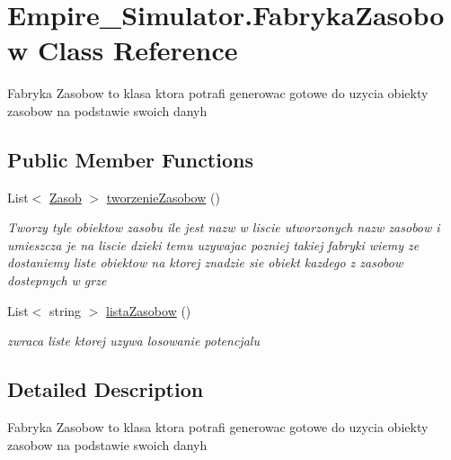 \hypertarget{class_empire___simulator_1_1_fabryka_zasobow}{\section{Empire\+\_\+\+Simulator.\+Fabryka\+Zasobow Class Reference}
\label{class_empire___simulator_1_1_fabryka_zasobow}
}


Fabryka Zasobow to klasa ktora potrafi generowac gotowe do uzycia obiekty zasobow na podstawie swoich danyh  


\subsection*{Public Member Functions}
\begin{DoxyCompactItemize}
\item 
List$<$ \hyperlink{class_empire___simulator_1_1_zasob}{Zasob} $>$ \hyperlink{class_empire___simulator_1_1_fabryka_zasobow_a3fb3f39dd352878a2131ac7cedea0f29}{tworzenie\+Zasobow} ()
\begin{DoxyCompactList}\small\item\em Tworzy tyle obiektow zasobu ile jest nazw w liscie utworzonych nazw zasobow i umieszcza je na liscie dzieki temu uzywajac pozniej takiej fabryki wiemy ze dostaniemy liste obiektow na ktorej znadzie sie obiekt kazdego z zasobow dostepnych w grze \end{DoxyCompactList}\item 
List$<$ string $>$ \hyperlink{class_empire___simulator_1_1_fabryka_zasobow_a4a16809482dea3984053434ccc065769}{lista\+Zasobow} ()
\begin{DoxyCompactList}\small\item\em zwraca liste ktorej uzywa losowanie potencjalu \end{DoxyCompactList}\end{DoxyCompactItemize}


\subsection{Detailed Description}
Fabryka Zasobow to klasa ktora potrafi generowac gotowe do uzycia obiekty zasobow na podstawie swoich danyh 



